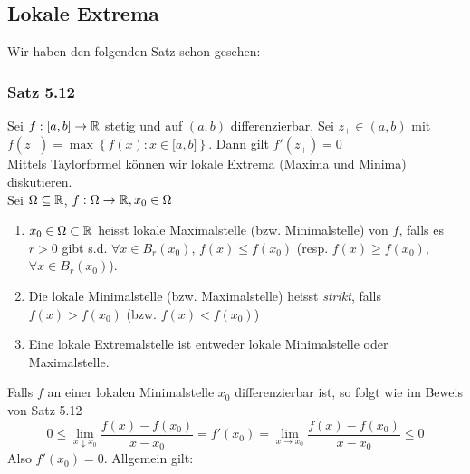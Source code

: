 \subsection*{Lokale Extrema}
Wir haben den folgenden Satz schon gesehen:

\subsubsection*{Satz 5.12}
Sei $f:\lbrack a,b\rbrack\to\mathbb{R}$ stetig und auf $(a,b)$ differenzierbar. Sei $z_+\in( a,b)$ mit $f(z_+)=\max\left\{ f(x):x\in\lbrack a,b\rbrack\right\}$. Dann gilt $f'(z_+)=0$\\

\noindent Mittels Taylorformel können wir lokale Extrema (Maxima und Minima) diskutieren. \\

\noindent Sei $\Omega\subseteq\mathbb{R}$, $f:\Omega\to\mathbb{R}, x_0\in\Omega$

\begin{definition}{5.38}
\begin{enumerate}
\item $x_0\in\Omega\subset\mathbb{R}$ heisst lokale Maximalstelle (bzw. Minimalstelle) von $f$, falls es $r>0$ gibt s.d. $\forall x\in B_r(x_0)$, $f(x)\leq f(x_0)$ (resp. $f(x)\geq f(x_0)$, $\forall x\in B_r(x_0)$).
\item Die lokale Minimalstelle (bzw. Maximalstelle) heisst \emph{strikt}, falls $f(x)>f(x_0)$ (bzw. $f(x)<f(x_0)$)
\item Eine lokale Extremalstelle ist entweder lokale Minimalstelle oder Maximalstelle.
\end{enumerate}
\end{definition}
Falls $f$ an einer lokalen Minimalstelle $x_0$ differenzierbar ist, so folgt wie im Beweis von Satz 5.12 
\[0\leq \lim\limits_{x\downarrow x_0}\frac{f(x)-f(x_0)}{x-x_0}=f'(x_0)=\lim\limits_{x\to x_0}\frac{f(x)-f(x_0)}{x-x_0}\leq 0\]
Also $f'(x_0)=0$. Allgemein gilt:
